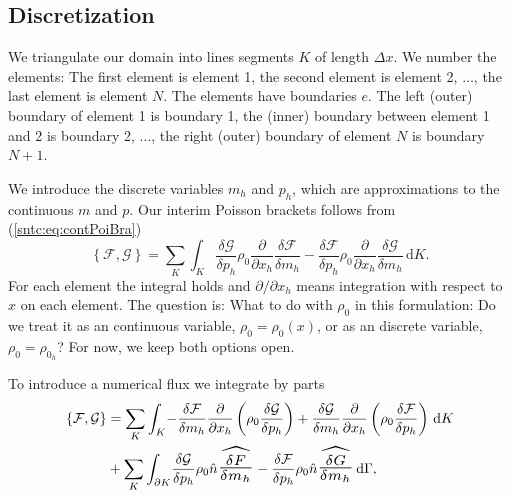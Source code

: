 \documentclass{article}
\begin{document}
\subsection{Discretization}
We triangulate our domain into lines segments $K$ of length $\Delta x$. We number the elements: The first element is element 1, the second element is element 2, $\hdots$, the last element is element $N$. The elements have boundaries $e$. The left (outer) boundary of element 1 is boundary 1, the (inner) boundary between element 1 and 2 is boundary 2, $\hdots$, the right (outer) boundary of element $N$ is boundary $N+1$.

We introduce the discrete variables $m_h$ and $p_h$, which are approximations to the continuous $m$ and $p$. Our interim Poisson brackets follows from (\ref{sntc:eq:contPoiBra})
\begin{equation}
	\left\{\mathcal{F}, \mathcal{G}\right\} = \sum_K \int_K \! \frac{\delta \mathcal{G}}{\delta p_h} \rho_0 \frac{\partial}{\partial x_h} \frac{\delta \mathcal{F}}{\delta m_h} - \frac{\delta \mathcal{F}}{\delta p_h} \rho_0 \frac{\partial}{\partial x_h} \frac{\delta \mathcal{G}}{\delta m_h} \, \mathrm{d}K.
\end{equation}
For each element the integral holds and $\partial/\partial x_h$ means integration with respect to $x$ on each element. The question is: What to do with $\rho_0$ in this formulation: Do we treat it as an continuous variable, $\rho_0 = \rho_0(x)$, or as an discrete variable, $\rho_0 = \rho_{0_h}$? For now, we keep both options open.

To introduce a numerical flux we integrate by parts
\begin{equation}
	\label{sntc:eq:intPoiBra}
	\begin{aligned}
\left\{\mathcal{F}, \mathcal{G}\right\} &= \sum_K \int_K \! -  \frac{\delta \mathcal{F}}{\delta m_h} \frac{\partial}{\partial x_h} \left( \rho_0 \frac{\delta \mathcal{G}}{\delta p_h} \right) + \frac{\delta \mathcal{G}}{\delta m_h} \frac{\partial}{\partial x_h}  \left( \rho_0  \frac{\delta \mathcal{F}}{\delta p_h} \right)  \, \mathrm{d}K \\
&+ \sum_K \int_{\partial K} \! \frac{\delta \mathcal{G}}{\delta p_h} \rho_0 \hat{n} \scalebox{2}{$\widehat{\scalebox{0.725}{$\frac{\delta F}{\delta m_h}$}}$} - \frac{\delta \mathcal{F}}{\delta p_h} \rho_0 \hat{n} \scalebox{2}{$\widehat{\scalebox{0.725}{$\frac{\delta G}{\delta m_h}$}}$} \, \mathrm{d}\Gamma,
	\end{aligned}
\end{equation}
\end{document}
